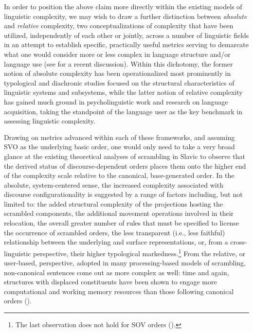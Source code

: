 \documentclass[output=paper]{langscibook}
\begin{document}
In order to position the above claim more directly within the existing models of linguistic complexity, we may wish to draw a further distinction between \textit{absolute} and \textit{relative} complexity, two conceptualizations of complexity that have been utilized, independently of each other or jointly, across a number of linguistic fields in an attempt to establish specific, practically useful metrics serving to demarcate what one would consider more or less complex in language structure and/or language use (see \citealt{LalekoScontras2021} for a recent discussion). Within this dichotomy, the former notion of absolute complexity has been operationalized most prominently in typological and diachronic studies focused on the structural characteristics of linguistic systems and subsystems, while the latter notion of relative complexity has gained much ground in psycholinguistic work and research on language acquisition, taking the standpoint of the language user as the key benchmark in assessing linguistic complexity.

Drawing on metrics advanced within each of these frameworks, and assuming SVO as the underlying basic order, one would only need to take a very broad glance at the existing theoretical analyses of scrambling in Slavic to observe that the derived status of discourse-dependent orders places them onto the higher end of the complexity scale relative to the canonical, base-generated order. In the absolute, system-centered sense, the increased complexity associated with discourse configurationality is suggested by a range of factors including, but not limited to: the added structural complexity of the projections hosting the scrambled components, the additional movement operations involved in their relocation, the overall greater number of rules that must be specified to license the occurrence of scrambled orders, the less transparent (i.e., less faithful) relationship between the underlying and surface representations, or, from a cross-linguistic perspective, their higher typological markedness.\footnote{The last observation does not hold for SOV orders (\citealt{Greenberg1963, Dryer2013Order}).} From the relative, or user-based, perspective, adopted in many processing-based models of scrambling, non-canonical sentences come out as more complex as well: time and again, structures with displaced constituents have been shown to engage more computational and working memory resources than those following canonical orders (\citealt{Gibson1998, Just1996}).
\end{document}
